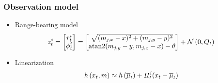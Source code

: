     \begin{frame}
     \frametitle{Observation model}
     \begin{itemize}
     \item Range-bearing model
     \begin{equation*}
     z_{t}^{i} =
     \begin{bmatrix}
     r_{t}^{i}\\
     \phi_{t}^{i}
     \end{bmatrix} =
     \begin{bmatrix}
     \sqrt{(m_{j,x}-x)^{2} + (m_{j,y}-y)^{2}}\\
     \operatorname{atan2}(m_{j,y}-y, m_{j,x}-x) -\theta
     \end{bmatrix}
     + \mathcal{N}\left( {0}, {Q_{t}} \right)
     \end{equation*}
    
     \item Linearization
     \begin{equation*}
     h\left( x_{t}, m \right) \approx h\left( \overline{\mu}_{t} \right) + H_{t}^{i}(x_{t}-\overline{\mu}_{t})
     \end{equation*}
     \end{itemize}
    
    \end{frame}
    
